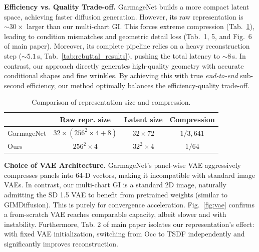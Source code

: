 \documentclass[10pt,twocolumn,letterpaper]{article}
\begin{document}
\begin{table}[h]
\centering
{}
\caption{Comparison of reconstruction protocols. $t_\text{recon}$ denotes mesh extraction latency.}
\label{tab:rebuttal_results}
\end{table}

\noindent\textbf{ Efficiency vs. Quality Trade-off.} GarmageNet builds a more compact latent space, achieving faster diffusion generation. However, its raw representation is ${\sim}30\times$ larger than our multi-chart GI. This forces extreme compression (Tab.~\ref{tab:comp}), leading to condition mismatches and geometric detail loss (Tab.~1, 5, and Fig.~6 of main paper). Moreover, its complete pipeline relies on a heavy reconstruction step (${\sim}5.1$\,s, Tab.~\ref{tab:rebuttal_results}), pushing the total latency to ${\sim}8$\,s. In contrast, our approach directly generates high-quality geometry with accurate conditional shapes and fine wrinkles. By achieving this with true \emph{end-to-end} sub-second efficiency, our method optimally balances the efficiency-quality trade-off.

\begin{table}[!htbp]
\centering
\small
\begin{tabular}{@{}lccc@{}}
\toprule
& Raw repr. size & Latent size & Compression \\
\midrule
GarmageNet & $32{\times}(256^2{\times}4{+}8)$ & $32{\times}72$ & $1/3{,}641$ \\
Ours       & $256^2{\times}4$                 & $32^2{\times}4$ & $1/64$ \\
\bottomrule
\end{tabular}
\caption{Comparison of representation size and compression.}
\label{tab:comp}
\end{table}
\noindent\textbf{ Choice of VAE Architecture.} GarmageNet's panel-wise VAE aggressively compresses panels into 64-D vectors, making it incompatible with standard image VAEs. In contrast, our multi-chart GI is a standard 2D image, naturally admitting the SD 1.5 VAE to benefit from pretrained weights (similar to GIMDiffusion). This is purely for convergence acceleration. Fig.~\ref{fig:vae} confirms a from-scratch VAE reaches comparable capacity, albeit slower and with instability. Furthermore, Tab. 2 of main paper isolates our representation's effect: with fixed VAE initialization, switching from Occ to TSDF independently and significantly improves reconstruction.
\end{document}
